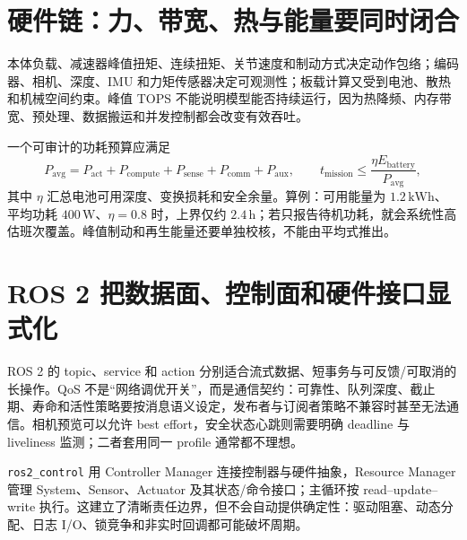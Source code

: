 \section{硬件链：力、带宽、热与能量要同时闭合}

本体负载、减速器峰值扭矩、连续扭矩、关节速度和制动方式决定动作包络；编码器、相机、深度、IMU 和力矩传感器决定可观测性；板载计算又受到电池、散热和机械空间约束。峰值 TOPS 不能说明模型能否持续运行，因为热降频、内存带宽、预处理、数据搬运和并发控制都会改变有效吞吐。

一个可审计的功耗预算应满足
\begin{equation}
P_{\mathrm{avg}}=P_{\mathrm{act}}+P_{\mathrm{compute}}+P_{\mathrm{sense}}+
P_{\mathrm{comm}}+P_{\mathrm{aux}},\qquad
t_{\mathrm{mission}}\leq \frac{\eta E_{\mathrm{battery}}}{P_{\mathrm{avg}}},
\label{eq:power-mission-budget}
\end{equation}
其中 $\eta$ 汇总电池可用深度、变换损耗和安全余量。算例：可用能量为 $1.2\,\mathrm{kWh}$、平均功耗 $400\,\mathrm{W}$、$\eta=0.8$ 时，上界仅约 $2.4\,\mathrm{h}$；若只报告待机功耗，就会系统性高估班次覆盖。峰值制动和再生能量还要单独校核，不能由平均式推出。

\section{ROS 2 把数据面、控制面和硬件接口显式化}

ROS 2 的 topic、service 和 action 分别适合流式数据、短事务与可反馈/可取消的长操作。QoS 不是“网络调优开关”，而是通信契约：可靠性、队列深度、截止期、寿命和活性策略要按消息语义设定，发布者与订阅者策略不兼容时甚至无法通信\cite{ros2jazzyqos}。相机预览可以允许 best effort，安全状态心跳则需要明确 deadline 与 liveliness 监测；二者套用同一 profile 通常都不理想。

\texttt{ros2\_control} 用 Controller Manager 连接控制器与硬件抽象，Resource Manager 管理 System、Sensor、Actuator 及其状态/命令接口；主循环按 read--update--write 执行\cite{ros2control2026}。这建立了清晰责任边界，但不会自动提供确定性：驱动阻塞、动态分配、日志 I/O、锁竞争和非实时回调都可能破坏周期。

